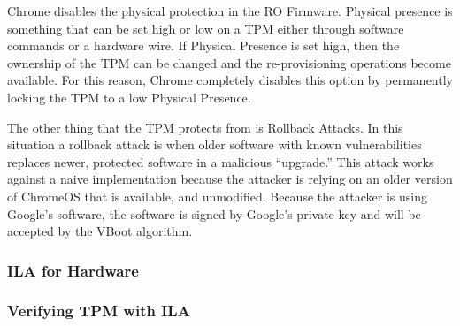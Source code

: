 \documentclass[../report.tex]{subfiles}
\begin{document}
Chrome disables the physical protection in the RO Firmware.
Physical presence is something that can be set high or low on a TPM either through software commands or a hardware wire. 
If Physical Presence is set high, then the ownership of the TPM can be changed and the re-provisioning operations become available.
For this reason, Chrome completely disables this option by permanently locking the TPM to a low Physical Presence\@.

The other thing that the TPM protects from is Rollback Attacks.
In this situation a rollback attack is when older software with known
vulnerabilities replaces newer, protected software in a malicious ``upgrade.''
This attack works against a naive implementation because the attacker is relying on an older version of ChromeOS that is available, and unmodified.
Because the attacker is using Google's software, the software is signed by Google's private key and will be accepted by the VBoot algorithm.

\subsubsection{ILA for Hardware}   

\subsubsection{Verifying TPM with ILA}   
\clearpage
\end{document}
